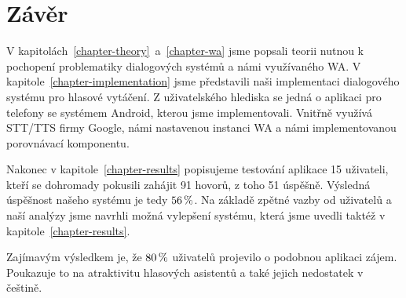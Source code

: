 \chapter*{Závěr}

V kapitolách~\ref{chapter-theory}~a~\ref{chapter-wa} jsme popsali teorii nutnou
k pochopení problematiky dialogových systémů a námi využívaného WA.
V kapitole~\ref{chapter-implementation} jsme představili naši
implementaci dialogového systému pro hlasové vytáčení.
Z uživatelského hlediska se jedná o aplikaci pro telefony se
systémem Android, kterou jsme implementovali. Vnitřně využívá STT/TTS
firmy Google, námi nastavenou instanci WA a námi implementovanou porovnávací
komponentu.

Nakonec v kapitole~\ref{chapter-results} popisujeme testování
aplikace 15 uživateli, kteří se dohromady pokusili zahájit 91 hovorů,
z toho 51 úspěšně. Výsledná úspěšnost našeho systému je tedy \(56\,\rm \%\).
Na základě zpětné vazby od uživatelů a naší analýzy jsme navrhli možná
vylepšení systému, která jsme uvedli taktéž v kapitole~\ref{chapter-results}.

Zajímavým výsledkem je, že \(80\,\rm \%\) uživatelů projevilo o podobnou
aplikaci zájem. Poukazuje to na atraktivitu hlasových asistentů
a také jejich nedostatek v češtině.